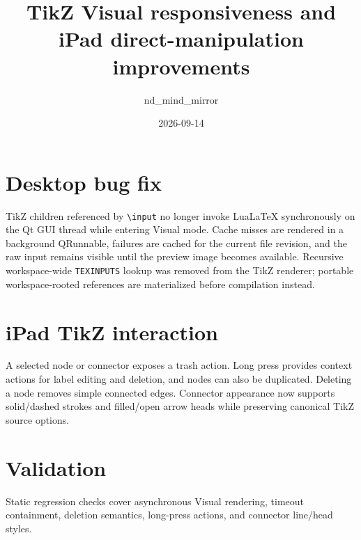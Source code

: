 \documentclass[a4paper]{article}
\title{TikZ Visual responsiveness and iPad direct-manipulation improvements}
\date{2026-09-14}
\author{nd\_mind\_mirror}
\begin{document}
\maketitle

\section*{Desktop bug fix}
TikZ children referenced by \texttt{\textbackslash input} no longer invoke LuaLaTeX synchronously on the Qt GUI thread while entering Visual mode. Cache misses are rendered in a background QRunnable, failures are cached for the current file revision, and the raw input remains visible until the preview image becomes available. Recursive workspace-wide \texttt{TEXINPUTS} lookup was removed from the TikZ renderer; portable workspace-rooted references are materialized before compilation instead.

\section*{iPad TikZ interaction}
A selected node or connector exposes a trash action. Long press provides context actions for label editing and deletion, and nodes can also be duplicated. Deleting a node removes simple connected edges. Connector appearance now supports solid/dashed strokes and filled/open arrow heads while preserving canonical TikZ source options.

\section*{Validation}
Static regression checks cover asynchronous Visual rendering, timeout containment, deletion semantics, long-press actions, and connector line/head styles.
\end{document}
